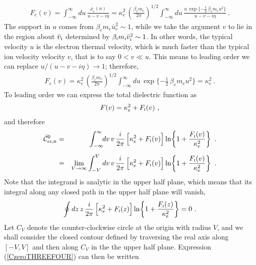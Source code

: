 \documentclass[preprint,12pt,eqsecnum,nofootinbib,amsmath,amssymb]{revtex4}
\newcommand{\smI}{{\rm\scriptscriptstyle I}}
\newcommand{\smR}{{\rm\scriptscriptstyle R}}
\begin{document}
{{{{{{{%
\begin{eqnarray}
  F_e(v) = \int_{-\infty}^\infty du\, \frac{\rho_e(u)}{u -v - i \eta}
  = \kappa_e^2 \,\left(\frac{\beta_e m_e}{2\pi}\right)^{1/2}
  \int_{-\infty}^\infty du\, \frac{u\,\exp\{-\frac{1}{2}\, \beta_e m_e
    u^2\}}{u -v - i \eta} \ .
\end{eqnarray}
The support in $u$ comes from $\beta_e m_e \bar u_e^2 \sim 1$, while
we take the argument $v$ to lie in the region about $\bar v_\smI$
determined by $\beta_\smI m_\smI \bar v_\smI^2 \sim 1$. In other
words, the typical velocity $u$ is the electron thermal velocity,
which is much faster than the typical ion velocity velocity $v$, that
is to say $0 < v \ll u $.  This means to leading order we can replace
$u/(u-v-i\eta) \to 1$; therefore,
\begin{eqnarray}
  F_e(v) 
  = 
  \kappa_e^2 \,\left(\frac{\beta_e m_e}{2\pi}\right)^{1/2}
  \int_{-\infty}^\infty du\, \exp\{-\frac{1}{2}\, \beta_e m_e  u^2\}
  =
  \kappa_e^2 \ .
\end{eqnarray}
To leading order we can express the total dielectric function as
\begin{eqnarray}
  F(v) = \kappa_e^2 + F_\smI(v) \ ,
\end{eqnarray}
and therefore
\begin{eqnarray}
  \bar{\cal C}^0_{e\smI,\smR} 
  &=&
  \int_{-\infty}^{\infty} \!\! dv \, v\, 
  \frac{i}{2 \pi} \,\Big[\kappa_e^2 + F_\smI(v) \Big]
  \ln\! \left\{1 + \frac{F_\smI(v)}{\kappa_e^2}\right\} \ .
\label{CzeroTWO}  
\\[5pt]
  &=&
  \lim_{V \to \infty}
  \int_{-V}^V dv \, v\, \frac{i}{2 \pi} \,\Big[\kappa_e^2 + F_\smI(v) 
  \Big] \ln\! \left\{1 + \frac{F_\smI(v)}{\kappa_e^2}\right\} \ .
\label{CzeroTHREE}  
\end{eqnarray}
Note that the integrand is analytic in the upper half plane, which
means that its integral along any closed path in the upper half plane
will vanish,
\begin{eqnarray}
  \oint dz \, z\, 
  \frac{i}{2 \pi} \,\Big[\kappa_e^2 + F_\smI(z) \Big]
  \ln\! \left\{1 + \frac{F_\smI(z)}{\kappa_e^2}\right\} 
  = 0 \ .
\label{CzeroTHREEFOUR}  
\end{eqnarray}
Let $C_V$ denote the counter-clockwise circle at the origin with
radius $V$, and we shall consider the closed contour defined by
traversing the real axis along $[-V,V]$ and then along $C_V$ in the
the upper half plane. Expression (\ref{CzeroTHREEFOUR}) can then be
written
\begin{eqnarray}

\end{eqnarray}}}}}}}}
\end{document}
